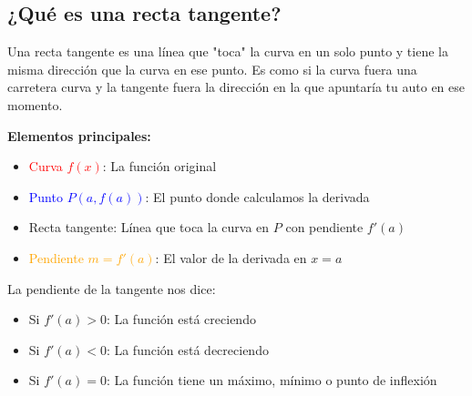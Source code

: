 \documentclass[12pt,a4paper]{article}
\begin{document}
\subsection*{¿Qué es una recta tangente?}

Una recta tangente es una línea que "toca" la curva en un solo punto y tiene la misma dirección que la curva en ese punto. Es como si la curva fuera una carretera curva y la tangente fuera la dirección en la que apuntaría tu auto en ese momento.

\begin{center}
\begin{minipage}{0.52\textwidth}
	\textbf{Elementos principales:}
	\begin{itemize}
		\item \textcolor{red}{Curva $f(x)$}: La función original
		\item \textcolor{blue}{Punto $P(a, f(a))$}: El punto donde calculamos la derivada
		\item \textcolor{green!60!black}{Recta tangente}: Línea que toca la curva en $P$ con pendiente $f'(a)$
		\item \textcolor{orange}{Pendiente $m = f'(a)$}: El valor de la derivada en $x=a$
	\end{itemize}

	\bigskip
	La pendiente de la tangente nos dice:
	\begin{itemize}
		\item Si $f'(a) > 0$: La función está creciendo
		\item Si $f'(a) < 0$: La función está decreciendo
		\item Si $f'(a) = 0$: La función tiene un máximo, mínimo o punto de inflexión
	\end{itemize}
\end{minipage}
\hfill
\begin{minipage}{0.45\textwidth}
\end{minipage}
\end{center}
\end{document}
